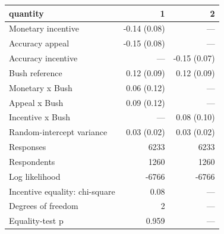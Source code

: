 \begin{tabular}{lrr}
\toprule
quantity & 1 & 2 \\
\midrule
Monetary incentive & -0.14 (0.08) & — \\
Accuracy appeal & -0.15 (0.08) & — \\
Accuracy incentive & — & -0.15 (0.07) \\
Bush reference & 0.12 (0.09) & 0.12 (0.09) \\
Monetary x Bush & 0.06 (0.12) & — \\
Appeal x Bush & 0.09 (0.12) & — \\
Incentive x Bush & — & 0.08 (0.10) \\
Random-intercept variance & 0.03 (0.02) & 0.03 (0.02) \\
Responses & 6233 & 6233 \\
Respondents & 1260 & 1260 \\
Log likelihood & -6766 & -6766 \\
Incentive equality: chi-square & 0.08 & — \\
Degrees of freedom & 2 & — \\
Equality-test p & 0.959 & — \\
\bottomrule
\end{tabular}
